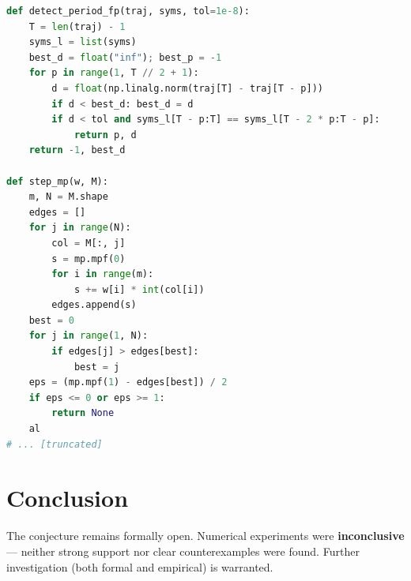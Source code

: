 \documentclass[11pt]{article}
\begin{document}
\begin{lstlisting}[language=Python]
def detect_period_fp(traj, syms, tol=1e-8):
    T = len(traj) - 1
    syms_l = list(syms)
    best_d = float("inf"); best_p = -1
    for p in range(1, T // 2 + 1):
        d = float(np.linalg.norm(traj[T] - traj[T - p]))
        if d < best_d: best_d = d
        if d < tol and syms_l[T - p:T] == syms_l[T - 2 * p:T - p]:
            return p, d
    return -1, best_d

def step_mp(w, M):
    m, N = M.shape
    edges = []
    for j in range(N):
        col = M[:, j]
        s = mp.mpf(0)
        for i in range(m):
            s += w[i] * int(col[i])
        edges.append(s)
    best = 0
    for j in range(1, N):
        if edges[j] > edges[best]:
            best = j
    eps = (mp.mpf(1) - edges[best]) / 2
    if eps <= 0 or eps >= 1:
        return None
    al
# ... [truncated]
\end{lstlisting}


\section{Conclusion}

The conjecture remains formally open. Numerical experiments were \textbf{inconclusive} --- neither strong support nor clear counterexamples were found.
Further investigation (both formal and empirical) is warranted.
\end{document}
